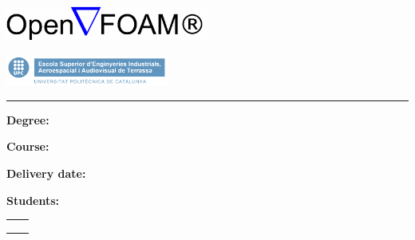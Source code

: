 


\begin{center}\bf

\includegraphics[width=0.50\textwidth]{./doc_config/images/openfoamlogotm.png}

\vspace{50pt}


\vspace{10pt}

\includegraphics[width=0.4\textwidth]{./doc_config/images/UPC_ESEIAAT.jpg}

\vspace{40pt}

\vspace{10pt}



\textcolor{UPC_blue}{\rule{\textwidth}{.6pt}}

{\Large \ProjectName}

\end{center}

\vspace{10pt}

\textbf{Degree:} \Degree

\textbf{Course:} \Course


\textbf{Delivery date:} \DocDate\\

\vspace{10pt}

\textbf{Students:}\vspace{7pt}

\begin{tabular}{ll}
	\Studi    \hspace*{30pt}\\
	\Studii   \hspace*{30pt}\\
	\Studiii  \hspace*{30pt} \\
	
\end{tabular}\\

\vspace{10pt}